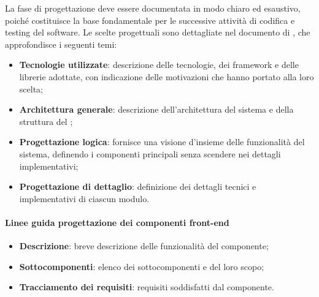 \label{specifica-tecnica}
\par La fase di progettazione deve essere documentata in modo chiaro ed esaustivo, poiché costituisce la base fondamentale per le successive attività di codifica e testing del software. Le scelte progettuali sono dettagliate nel documento di \ST, che approfondisce i seguenti temi:
\begin{itemize}
  \item \textbf{Tecnologie utilizzate}: descrizione delle tecnologie, dei framework e delle librerie adottate, con indicazione delle motivazioni che hanno portato alla loro scelta;
  \item \textbf{Architettura generale}: descrizione dell'architettura del sistema e della struttura del ;
  \item \textbf{Progettazione logica}: fornisce una visione d'insieme delle funzionalità del sistema, definendo i componenti principali senza scendere nei dettagli implementativi;
  \item \textbf{Progettazione di dettaglio}: definizione dei dettagli tecnici e implementativi di ciascun modulo.
\end{itemize}

\paragraph*{Linee guida progettazione dei componenti front-end}
\begin{itemize}
  \item \textbf{Descrizione}: breve descrizione delle funzionalità del componente;
  \item \textbf{Sottocomponenti}: elenco dei sottocomponenti e del loro scopo;
  \item \textbf{Tracciamento dei requisiti}: requisiti soddisfatti dal componente.
\end{itemize}

